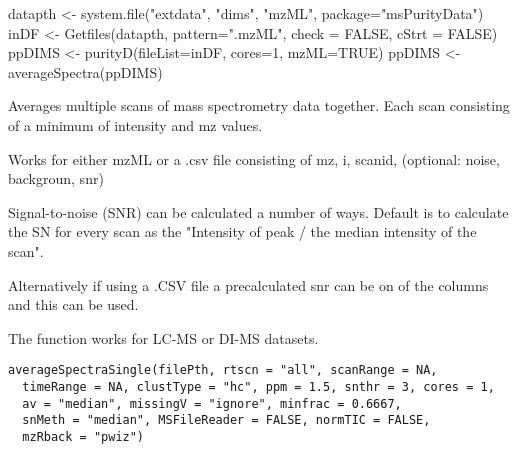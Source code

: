 \documentclass[letterpaper]{book}
\begin{document}
%
\begin{Examples}
\begin{ExampleCode}

datapth <- system.file("extdata", "dims", "mzML", package="msPurityData")
inDF <- Getfiles(datapth, pattern=".mzML", check = FALSE, cStrt = FALSE)
ppDIMS <- purityD(fileList=inDF, cores=1, mzML=TRUE)
ppDIMS <- averageSpectra(ppDIMS)
\end{ExampleCode}
\end{Examples}
%
\begin{Description}\relax
Averages multiple scans of mass spectrometry data together.
Each scan consisting of a minimum of intensity and mz values.

Works for either mzML or a .csv file consisting of mz, i, scanid,
(optional: noise, backgroun, snr)

Signal-to-noise (SNR) can be calculated a number of ways. Default is to
calculate the SN for every scan as the
"Intensity of peak / the median intensity of the scan".

Alternatively if using a .CSV file a precalculated snr can be on of the
columns and this can be used.

The function works for LC-MS or DI-MS datasets.
\end{Description}
%
\begin{Usage}
\begin{verbatim}
averageSpectraSingle(filePth, rtscn = "all", scanRange = NA,
  timeRange = NA, clustType = "hc", ppm = 1.5, snthr = 3, cores = 1,
  av = "median", missingV = "ignore", minfrac = 0.6667,
  snMeth = "median", MSFileReader = FALSE, normTIC = FALSE,
  mzRback = "pwiz")
\end{verbatim}
\end{Usage}
%
\end{document}
